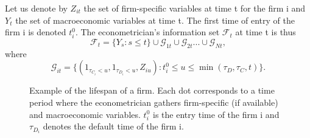 Let us denote by $Z_{it}$ the set of firm-specific variables at time t for the firm i and $Y_t$ the set of macroeconomic variables at time t. The first time of entry of the firm i is denoted  $t_i^0$. The econometrician's information set $\mathscr{F}_t$ at time t is thus
\begin{equation}
    \mathscr{F}_t = \{ Y_s : s \leq t \} \cup \mathscr{G}_{1t}  \cup \mathscr{G}_{2t} ... \cup \mathscr{G}_{Nt},
\end{equation}
where 
\begin{equation}
    \mathscr{G}_{it}  = \{  (1_{\tau_{C_i} < u} , 1_{\tau_{D_i} < u} , Z_{iu}) : t_i^0 \leq u \leq \min(\tau_D, \tau_C, t)  \}.
\end{equation}



\begin{figure}[H]
\label{lifespan}
\centering
\caption{Example of the lifespan of a firm. Each dot corresponds to a time period where the econometrician gathers firm-specific (if available) and macroeconomic variables. $t^0_i$ is the entry time of the firm i and $\tau_{D_i}$ denotes the default time of the firm i.}
\label{fig:lifespan}
\end{figure}

